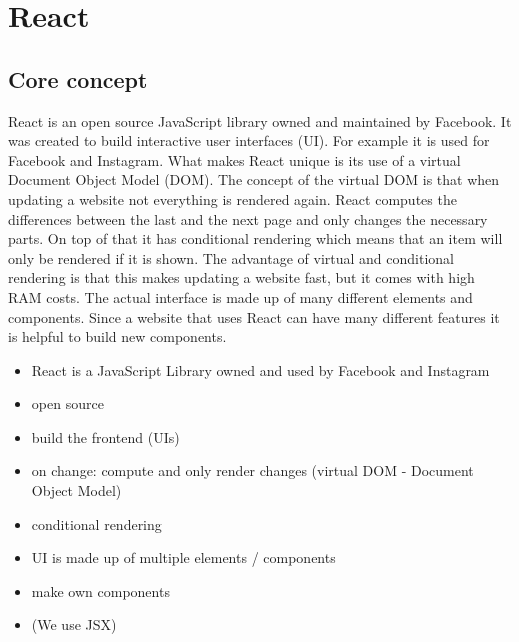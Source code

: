 \documentclass[11pt,a4paper]{article}
\begin{document}
\section{React}
	\subsection{Core concept}
	React is an open source JavaScript library owned and maintained by Facebook.	It was created to build interactive user interfaces (UI). For example it is used for Facebook and Instagram. What makes React unique is its use of a virtual Document Object Model (DOM). The concept of the virtual DOM is that when updating a website not everything is rendered again. React computes the differences between the last and the next page and only changes the necessary parts. On top of that it has conditional rendering which means that an item will only be rendered if it is shown. The advantage of virtual and conditional rendering is that this makes updating a website fast, but it comes with high RAM costs. The actual interface is made up of many different elements and components. Since a website that uses React can have many different features it is helpful to build new components.
	
	\begin{itemize}
	\item React is a JavaScript Library owned and used by Facebook and Instagram
	\item open source
	\item build the frontend (UIs)
	\item on change: compute and only render changes (virtual DOM - Document Object Model)
	\item conditional rendering
	\item UI is made up of multiple elements / components	
	\item make own components
	\item (We use JSX)
\end{itemize}		
	
\end{document}
